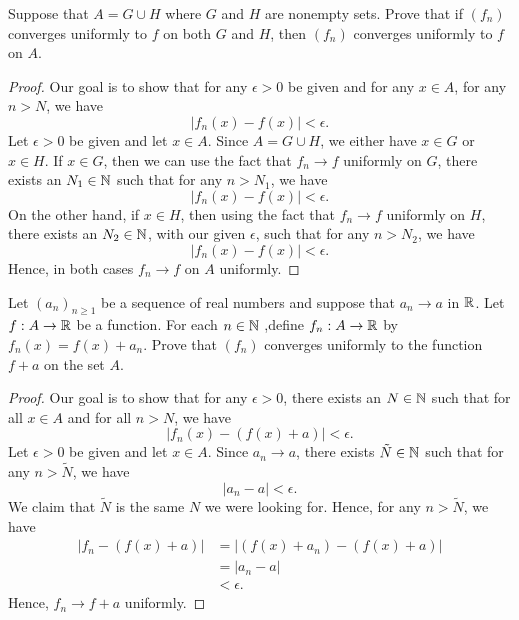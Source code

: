 \documentclass[a4paper]{article}
\begin{document}
\begin{problem}
   Suppose that \( A  = G \cup H  \) where \( G  \) and \( H  \) are nonempty sets. Prove that if \( ({f}_{n}) \) converges uniformly to \( f  \) on both \( G  \) and \( H  \), then \( ({f}_{n})  \) converges uniformly to \( f  \) on \( A  \).
\end{problem}
\begin{proof}
Our goal is to show that for any \( \epsilon > 0  \) be given and for any \( x \in A  \), for any \(  n > N  \), we have  
\[  | {f}_{n}(x) - f(x) |  < \epsilon. \]
Let \( \epsilon > 0  \) be given and let \( x \in A  \). Since \( A = G \cup H   \), we either have \( x \in G  \) or \( x \in H  \). If \( x \in G  \), then we can use the fact that \( {f}_{n} \to f  \) uniformly on \( G  \), there exists an \( {N}_{1} \in \mathbb{N} \) such that for any \( n > {N}_{1} \), we have 
\[  | {f}_{n}(x) - f(x) |  < \epsilon. \]
On the other hand, if \( x \in H  \), then using the fact that \( {f}_{n} \to f  \) uniformly on \( H  \), there exists an \( {N}_{2} \in \mathbb{N} \), with our given \( \epsilon  \), such that for any \( n > {N}_{2} \), we have 
\[  | {f}_{n}(x) - f(x) | < \epsilon. \]
Hence, in both cases \( {f}_{n} \to f  \) on \( A  \) uniformly.
\end{proof}

\begin{problem}
    Let \( ({a}_{n})_{n \geq 1} \) be a sequence of real numbers and suppose that \( {a}_{n} \to a  \) in \( \mathbb{R}  \). Let \( f: A \to \mathbb{R}  \) be a function. For each \( n \in \mathbb{N} \) ,define \( {f}_{n}: A \to \mathbb{R}  \) by \( {f}_{n}(x) = f(x)  + {a}_{n} \). Prove that \( ({f}_{n})  \) converges uniformly to the function \( f  + a  \) on the set \( A  \).
\end{problem}
\begin{proof}
Our goal is to show that for any \( \epsilon > 0  \), there exists an \( N \in \mathbb{N} \) such that for all \( x \in A  \) and for all \(  n > N  \), we have 
\[  | {f}_{n}(x) - (f(x) + a) |  < \epsilon. \]
Let \( \epsilon > 0  \) be given and let \( x \in A  \). Since \( {a}_{n} \to a  \), there exists \( \tilde{N} \in \mathbb{N} \) such that for any \( n > \tilde{N} \), we have 
\[  | {a}_{n} - a  |  < \epsilon. \]
We claim that \( \tilde{N} \) is the same \( N  \) we were looking for. Hence, for any \( n > \tilde{N} \), we have 
\begin{align*}
    | {f}_{n} - (f(x) + a) |  &= | (f(x) + {a}_{n}) - ( f(x) + a ) |  \\
                              &= | {a}_{n} - a  |  \\
                              &< \epsilon.
\end{align*}
Hence, \( {f}_{n} \to f + a  \) uniformly.
\end{proof} 
\end{document}
